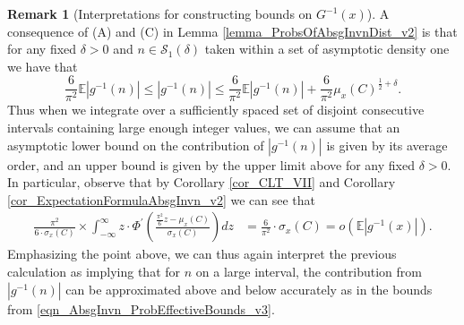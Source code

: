 \documentclass[11pt,reqno,a4letter]{article}
\numberwithin{figure}{section}
\numberwithin{table}{section}
\theoremstyle{plain}
\numberwithin{theorem}{section}
\theoremstyle{definition}
\newtheorem{remark}[theorem]{Remark}
\begin{document}
\begin{remark}[Interpretations for constructing bounds on $G^{-1}(x)$] 
A consequence of (A) and (C) in Lemma \ref{lemma_ProbsOfAbsgInvnDist_v2} 
is that for any fixed $\delta > 0$ and $n \in \mathcal{S}_1(\delta)$ 
taken within a set of asymptotic density one we have that 
\begin{equation} 
\label{eqn_AbsgInvn_ProbEffectiveBounds_v3} 
\frac{6}{\pi^2}\mathbb{E}|g^{-1}(n)| \leq |g^{-1}(n)| \leq \frac{6}{\pi^2}\mathbb{E}|g^{-1}(n)| + \frac{6}{\pi^2} 
     \mu_x(C)^{\frac{1}{2} + \delta}. 
\end{equation} 
Thus when we integrate over a sufficiently spaced set of disjoint consecutive intervals 
containing large enough integer values, 
we can assume that an asymptotic lower bound on the 
contribution of $|g^{-1}(n)|$ is given by its average 
order, and an upper bound is given by the upper limit above for any fixed $\delta > 0$. 
In particular, observe that by 
Corollary \ref{cor_CLT_VII} and 
Corollary \ref{cor_ExpectationFormulaAbsgInvn_v2} 
we can see that 
\begin{align*} 
\frac{\pi^2}{6 \cdot \sigma_x(C)} \times \int_{-\infty}^{\infty} z \cdot 
     \Phi^{\prime}\left(\frac{\frac{\pi^2}{6} z - \mu_x(C)}{\sigma_x(C)}\right) dz & = 
     \frac{6}{\pi^2} \cdot \sigma_x(C) = o\left(\mathbb{E}|g^{-1}(x)|\right). 
\end{align*} 
Emphasizing the point above, 
we can thus again interpret the previous calculation as implying that for $n$ on a large 
interval, the contribution from $|g^{-1}(n)|$ can be approximated above and below 
accurately as in the bounds from \eqref{eqn_AbsgInvn_ProbEffectiveBounds_v3}. 
\end{remark} 
\end{document}
